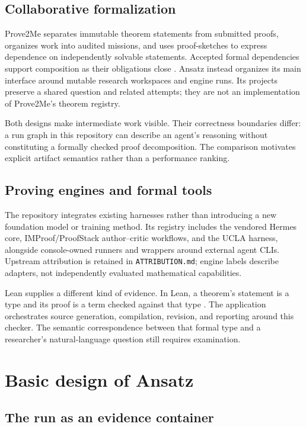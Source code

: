 \documentclass[10pt,letterpaper]{article}
\begin{document}
\subsection{Collaborative formalization}

Prove2Me separates immutable theorem statements from submitted proofs, organizes work into audited missions, and uses proof-sketches to express dependence on independently solvable statements. Accepted formal dependencies support composition as their obligations close \cite{prove2me}. Ansatz instead organizes its main interface around mutable research workspaces and engine runs. Its projects preserve a shared question and related attempts; they are not an implementation of Prove2Me's theorem registry.

Both designs make intermediate work visible. Their correctness boundaries differ: a run graph in this repository can describe an agent's reasoning without constituting a formally checked proof decomposition. The comparison motivates explicit artifact semantics rather than a performance ranking.

\subsection{Proving engines and formal tools}

The repository integrates existing harnesses rather than introducing a new foundation model or training method. Its registry includes the vendored Hermes core, IMProof/ProofStack author--critic workflows, and the UCLA harness, alongside console-owned runners and wrappers around external agent CLIs. Upstream attribution is retained in \nolinkurl{ATTRIBUTION.md}; engine labels describe adapters, not independently evaluated mathematical capabilities.

Lean supplies a different kind of evidence. In Lean, a theorem's statement is a type and its proof is a term checked against that type \cite{lean4}. The application orchestrates source generation, compilation, revision, and reporting around this checker. The semantic correspondence between that formal type and a researcher's natural-language question still requires examination.

\section{Basic design of Ansatz}

\subsection{The run as an evidence container}
\end{document}
